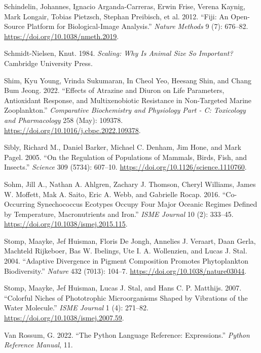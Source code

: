 \documentclass[
  letterpaper,
  DIV=11,
  numbers=noendperiod]{scrartcl}
\begin{document}
\begin{CSLReferences}
Schindelin, Johannes, Ignacio Arganda-Carreras, Erwin Frise, Verena
Kaynig, Mark Longair, Tobias Pietzsch, Stephan Preibisch, et al. 2012.
{``Fiji: {An} Open-Source Platform for Biological-Image Analysis.''}
\emph{Nature Methods} 9 (7): 676--82.
\url{https://doi.org/10.1038/nmeth.2019}.

Schmidt-Nielsen, Knut. 1984. \emph{Scaling: {Why} Is {Animal Size So
Important}?} {Cambridge University Press}.

Shim, Kyu Young, Vrinda Sukumaran, In Cheol Yeo, Heesang Shin, and Chang
Bum Jeong. 2022. {``Effects of Atrazine and Diuron on Life Parameters,
Antioxidant Response, and Multixenobiotic Resistance in Non-Targeted
Marine Zooplankton.''} \emph{Comparative Biochemistry and Physiology
Part - C: Toxicology and Pharmacology} 258 (May): 109378.
\url{https://doi.org/10.1016/j.cbpc.2022.109378}.

Sibly, Richard M., Daniel Barker, Michael C. Denham, Jim Hone, and Mark
Pagel. 2005. {``On the {Regulation} of {Populations} of {Mammals},
{Birds}, {Fish}, and {Insects}.''} \emph{Science} 309 (5734): 607--10.
\url{https://doi.org/10.1126/science.1110760}.

Sohm, Jill A., Nathan A. Ahlgren, Zachary J. Thomson, Cheryl Williams,
James W. Moffett, Mak A. Saito, Eric A. Webb, and Gabrielle Rocap. 2016.
{``Co-Occurring {Synechococcus} Ecotypes Occupy Four Major Oceanic
Regimes Defined by Temperature, Macronutrients and Iron.''} \emph{ISME
Journal} 10 (2): 333--45. \url{https://doi.org/10.1038/ismej.2015.115}.

Stomp, Maayke, Jef Huisman, Floris De Jongh, Annelies J. Veraart, Daan
Gerla, Machteld Rijkeboer, Bas W. Ibelings, Ute I. A. Wollenzien, and
Lucas J. Stal. 2004. {``Adaptive Divergence in Pigment Composition
Promotes Phytoplankton Biodiversity.''} \emph{Nature} 432 (7013):
104--7. \url{https://doi.org/10.1038/nature03044}.

Stomp, Maayke, Jef Huisman, Lucas J. Stal, and Hans C. P. Matthijs.
2007. {``Colorful Niches of Phototrophic Microorganisms Shaped by
Vibrations of the Water Molecule.''} \emph{ISME Journal} 1 (4): 271--82.
\url{https://doi.org/10.1038/ismej.2007.59}.

Van Rossum, G. 2022. {``The Python Language Reference: {Expressions}.''}
\emph{Python Reference Manual}, 11.


\end{CSLReferences}
\end{document}
